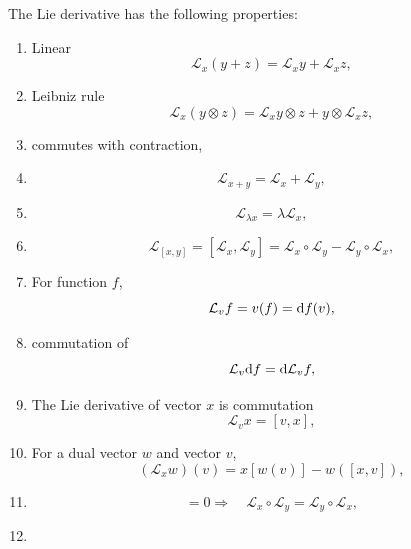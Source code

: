 The Lie derivative has the following properties:
\begin{enumerate}
	\item Linear \begin{equation}
		\mathcal{L}_x(y+z) = \mathcal{L}_x y + \mathcal{L}_x z,
	\end{equation}
	\item Leibniz rule 
	\begin{equation}
		\mathcal{L}_x(y \otimes z) = \mathcal{L}_x y \otimes z +y \otimes \mathcal{L}_x z,
	\end{equation}
	\item commutes with contraction,
	\item \begin{equation}
		\mathcal{L}_{x+y} = \mathcal{L}_x + \mathcal{L}_y,
	\end{equation}
	\item \begin{equation}
			\mathcal{L}_{\lambda x} = \lambda \mathcal{L}_x,
	\end{equation}
	\item 
	\begin{equation}
		\mathcal{L}_{[x,y]} = [\mathcal{L}_x,\mathcal{L}_y] = \mathcal{L}_x \circ \mathcal{L}_y - \mathcal{L}_y \circ \mathcal{L}_x,
	\end{equation}
	\item For function $f$,
	\begin{equation}
		\mathcal{L}_v f = v(f) = \mathrm{d} f(v),
	\end{equation}
	\item commutation of
	\begin{equation}
		\mathcal{L}_v \mathrm{d} f = \mathrm{d} \mathcal{L}_v f,
	\end{equation}
	\item The Lie derivative of vector $x$ is commutation
	\begin{equation}
		\mathcal{L}_v x = [v,x],
	\end{equation}
	\item For a dual vector $w$ and vector $v$,
	\begin{equation}
		\left(\mathcal{L}_x w\right)(v) = x[w(v)]-w([x,v]),
	\end{equation}
	\item \begin{equation}
		[x,y]=0 \Rightarrow \quad \mathcal{L}_x \circ \mathcal{L}_y = \mathcal{L}_y \circ \mathcal{L}_x,
	\end{equation}
	\item 

\end{enumerate}
